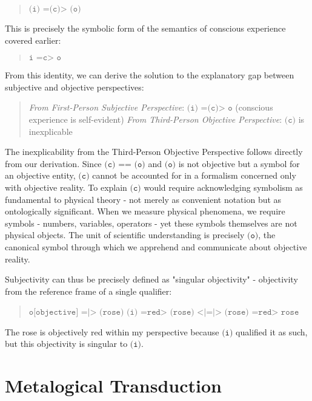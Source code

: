 \documentclass[runningheads]{llncs}
\begin{document}
\begin{quote}
$\texttt{(i) =(c)> (o)}$
\end{quote}

This is precisely the symbolic form of the semantics of conscious experience covered earlier:

\begin{quote}
$\texttt{i =c> o}$
\end{quote}

From this identity, we can derive the solution to the explanatory gap between subjective and objective perspectives:

\begin{quote}
\emph{From First-Person Subjective Perspective}: $\texttt{(i) =(c)> o}$ (conscious experience is self-evident)
\emph{From Third-Person Objective Perspective}: $\texttt{(c)}$ is inexplicable
\end{quote}

The inexplicability from the Third-Person Objective Perspective follows directly from our derivation. Since $\texttt{(c) == (o)}$ and $\texttt{(o)}$ is not objective but a symbol for an objective entity, $\texttt{(c)}$ cannot be accounted for in a formalism concerned only with objective reality. To explain $\texttt{(c)}$ would require acknowledging symbolism as fundamental to physical theory - not merely as convenient notation but as ontologically significant. When we measure physical phenomena, we require symbols - numbers, variables, operators - yet these symbols themselves are not physical objects. The unit of scientific understanding is precisely $\texttt{(o)}$, the canonical symbol through which we apprehend and communicate about objective reality.

Subjectivity can thus be precisely defined as "singular objectivity" - objectivity from the reference frame of a single qualifier:

\begin{quote}
$\texttt{o[objective] =|> (rose)}$
$\texttt{(i) =red> (rose) <|=|> (rose) =red> rose}$
\end{quote}

The rose is objectively red within my perspective because $\texttt{(i)}$ qualified it as such, but this objectivity is singular to $\texttt{(i)}$.

\section{Metalogical Transduction}
\end{document}

